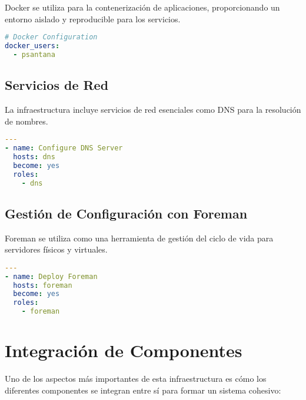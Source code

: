 \documentclass[12pt,a4paper]{article}
\begin{document}
Docker se utiliza para la contenerización de aplicaciones, proporcionando un entorno aislado y reproducible para los servicios.

\begin{lstlisting}[language=yaml, caption=Extracto de variables para Docker en group_vars/all.yml]
# Docker Configuration
docker_users:
  - psantana
\end{lstlisting}

\subsection{Servicios de Red}

La infraestructura incluye servicios de red esenciales como DNS para la resolución de nombres.

\begin{lstlisting}[language=yaml, caption=Extracto del playbook dns.yml]
---
- name: Configure DNS Server
  hosts: dns
  become: yes
  roles:
    - dns
\end{lstlisting}

\subsection{Gestión de Configuración con Foreman}

Foreman se utiliza como una herramienta de gestión del ciclo de vida para servidores físicos y virtuales.

\begin{lstlisting}[language=yaml, caption=Extracto del playbook deploy-foreman.yml]
---
- name: Deploy Foreman
  hosts: foreman
  become: yes
  roles:
    - foreman
\end{lstlisting}

\section{Integración de Componentes}
\newpage

Uno de los aspectos más importantes de esta infraestructura es cómo los diferentes componentes se integran entre sí para formar un sistema cohesivo:
\end{document}
